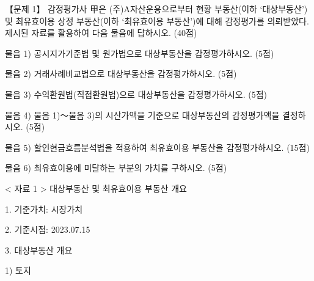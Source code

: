 \begin{longquestion}{【문제 1】}
감정평가사 甲은 (주)A자산운용으로부터 현황 부동산(이하 ‘대상부동산’) 및 최유효이용 상정 부동산(이하 ‘최유효이용 부동산’)에 대해 감정평가를 의뢰받았다. 제시된 자료를 활용하여 다음 물음에 답하시오. (40점) \par
\medskip\noindent 물음 1) 공시지가기준법 및 원가법으로 대상부동산을 감정평가하시오. (5점) \par
\medskip\noindent 물음 2) 거래사례비교법으로 대상부동산을 감정평가하시오. (5점) \par
\medskip\noindent 물음 3) 수익환원법(직접환원법)으로 대상부동산을 감정평가하시오. (5점) \par
\medskip\noindent 물음 4) 물음 1)～물음 3)의 시산가액을 기준으로 대상부동산의 감정평가액을 결정하시오. (5점) \par
\medskip\noindent 물음 5) 할인현금흐름분석법을 적용하여 최유효이용 부동산을 감정평가하시오. (15점) \par
\medskip\noindent 물음 6) 최유효이용에 미달하는 부분의 가치를 구하시오. (5점) \par
< 자료 1 > 대상부동산 및 최유효이용 부동산 개요 \par
1. 기준가치: 시장가치 \par
2. 기준시점: 2023.07.15 \par
3. 대상부동산 개요 \par
1) 토지 \par
{\small\centering
{}\par}


\end{longquestion}
